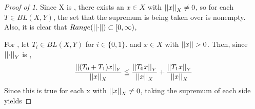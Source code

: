 \begin{prop}
\begin{proof}[Proof of 1] 
    Since X is \NonDegenerate, there exists an $x \in X$ with $\left|\left| x \right|\right|_X \neq 0$, 
    so for each $T \in BL(X,Y)$, the set that the supremum is being taken over is nonempty.
    Also, it is clear that $Range(\left|\left| \cdot \right|\right|) \subset [0,\infty)$, 

    For \Subadditivity, let $T_i \in BL(X,Y)$ for $i \in \{0,1\}$. and $x \in X$ with $\left|\left| x \right|\right| > 0$.
    Then, since $\left|\left| \cdot \right|\right|_Y$ is \Subadditive, 
    \begin{align*}
    \frac{\left|\left| (T_0+T_1)x \right|\right|_Y}{\left|\left| x \right|\right|_X} \leq \frac{\left|\left| T_0x \right|\right|_Y}{\left|\left| x \right|\right|_X}+ \frac{\left|\left| T_1x \right|\right|_Y}{\left|\left| x \right|\right|_X}
    \end{align*}
    Since this is true for each x with $\left|\left| x \right|\right|_X \neq 0$, taking the supremum of each side yields


\end{proof}
\end{prop}
